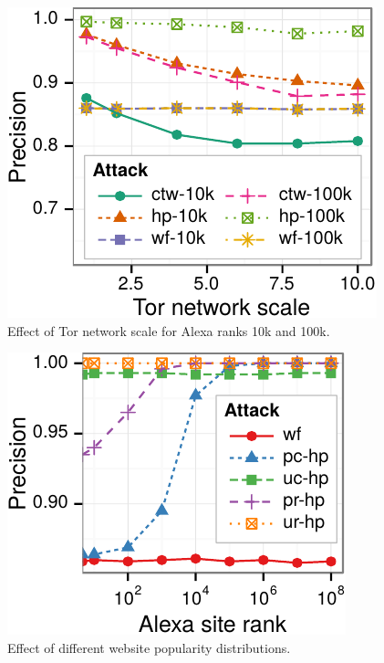 \begin{figure}[t]
\centering    \includegraphics[width=0.95\linewidth]{figures/fpt/scale/1kx100+100k-ggplot2}
\caption{Effect of Tor network scale for Alexa ranks 10k and 100k.}
    \label{fig:fpt:var:scale}
\end{figure}


\begin{figure}[t]
\centering    \includegraphics[width=0.95\linewidth]{figures/fpt/dist/1kx100+100k-ggplot2}
\caption{Effect of different website popularity distributions.}   \label{fig:fpt:var:dist}
\end{figure}
\fi


